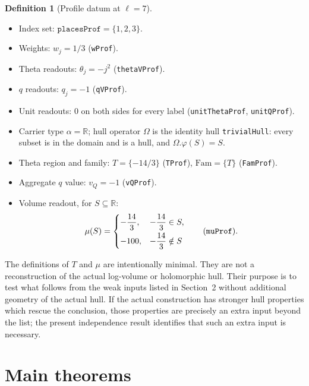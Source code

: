 \documentclass[11pt]{article}
\newcommand{\Fam}{\mathrm{Fam}}
\theoremstyle{definition}
\newtheorem{definition}[theorem]{Definition}
\begin{document}
\begin{definition}[Profile datum at $\ell=7$]
\begin{itemize}[leftmargin=*]
\item Index set: $\texttt{placesProf}=\{1,2,3\}$.
\item Weights: $w_j=1/3$ (\texttt{wProf}).
\item Theta readouts: $\theta_j=-j^2$ (\texttt{thetaVProf}).
\item $q$ readouts: $q_j=-1$ (\texttt{qVProf}).
\item Unit readouts: $0$ on both sides for every label
(\texttt{unitThetaProf}, \texttt{unitQProf}).
\item Carrier type $\alpha=\mathbb R$; hull operator $\Omega$ is
the identity hull \texttt{trivialHull}: every subset is in the
domain and is a hull, and $\Omega.\varphi(S)=S$.
\item Theta region and family:
$T=\{-14/3\}$ (\texttt{TProf}), $\Fam=\{T\}$ (\texttt{FamProf}).
\item Aggregate $q$ value: $v_Q=-1$ (\texttt{vQProf}).
\item Volume readout, for $S\subseteq\mathbb R$:
\[
\mu(S)=
\begin{cases}
-\dfrac{14}{3}, & -\dfrac{14}{3}\in S,\\[2mm]
-100, & -\dfrac{14}{3}\notin S
\end{cases}
\qquad\text{(\texttt{muProf})}.
\]
\end{itemize}
\end{definition}

The definitions of $T$ and $\mu$ are intentionally minimal.
They are not a reconstruction of the actual log-volume or
holomorphic hull.  Their purpose is to test what follows from
the weak inputs listed in Section~2 without additional geometry
of the actual hull.  If the actual construction has stronger
hull properties which rescue the conclusion, those properties
are precisely an extra input beyond the list; the present
independence result identifies that such an extra input is
necessary.

\section{Main theorems}
\end{document}
